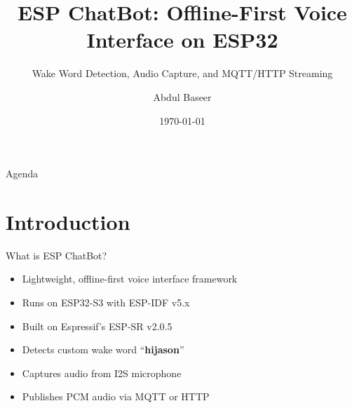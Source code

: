 \documentclass{beamer}
\title[ESP ChatBot]{\textbf{ESP ChatBot: Offline-First Voice Interface on ESP32}}
\subtitle{Wake Word Detection, Audio Capture, and MQTT/HTTP Streaming}
\author{Abdul Baseer}
\institute{AI | Embedded AI | ESP32 Developer}
\date{\today}
\begin{document}
\begin{frame}
  \titlepage
\end{frame}

\begin{frame}{Agenda}
  \tableofcontents
\end{frame}

\section{Introduction}
\begin{frame}{What is ESP ChatBot?}
  \begin{itemize}
    \item Lightweight, offline-first voice interface framework
    \item Runs on ESP32-S3 with ESP-IDF v5.x
    \item Built on Espressif’s ESP-SR v2.0.5
    \item Detects custom wake word ``\textbf{hijason}''
    \item Captures audio from I2S microphone
    \item Publishes PCM audio via MQTT or HTTP
  \end{itemize}
\end{frame}
 
 
\end{document}
